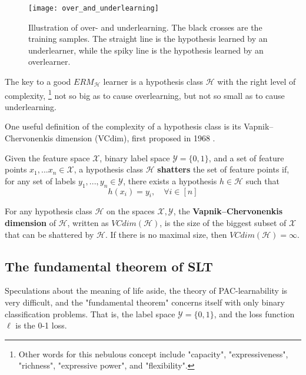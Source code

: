 \begin{figure}
	\centering
	\texttt{[image: over\_and\_underlearning]}
	\caption{Illustration of over- and underlearning. The black crosses are the training samples. The straight line is the hypothesis learned by an underlearner, while the spiky line is the hypothesis learned by an overlearner.}
	\label{fig:over_and_underlearning}
\end{figure}

The key to a good $ERM_{\mathcal{H}}$ learner is a hypothesis class $\mathcal{H}$ with the right level of complexity,
\footnote{Other words for this nebulous concept include "capacity", "expressiveness", "richness", "expressive power", and "flexibility".}
not so big as to cause overlearning, but not so small as to cause underlearning. 

One useful definition of the complexity of a hypothesis class is its Vapnik--Chervonenkis dimension (VCdim), first proposed in 1968 \cite{vapnikUniformConvergenceRelative1971}. 

\begin{defn}\label{defn:shatter}
Given the feature space $\mathcal{X}$, binary label space $\mathcal{Y} = \{0, 1\}$, and a set of feature points $x_1, ... x_n \in \mathcal{X}$, a hypothesis class $\mathcal{H}$ \textbf{shatters} the set of feature points if, for any set of labels $y_1, ..., y_n\in \mathcal{Y}$, there exists a hypothesis $h\in\mathcal{H}$ such that 
$$h(x_i) = y_i, \quad \forall i \in [n]$$
\end{defn}

\begin{defn}\label{defn:VCdim}
For any hypothesis class $\mathcal{H}$ on the spaces $\mathcal{X}, \mathcal{Y}$, the \textbf{Vapnik--Chervonenkis dimension} of $\mathcal{H}$, written as $VCdim(\mathcal{H})$, is the size of the biggest subset of $\mathcal{X}$ that can be shattered by $\mathcal{H}$. If there is no maximal size, then $VCdim(\mathcal{H}) = \infty$.
\end{defn}

\subsection{The fundamental theorem of SLT}
Speculations about the meaning of life aside, the theory of PAC-learnability is very difficult, and the "fundamental theorem" concerns itself with only binary classification problems. That is, the label space  $\mathcal{Y} = \{0, 1\}$, and the loss function $\ell$ is the 0-1 loss.

